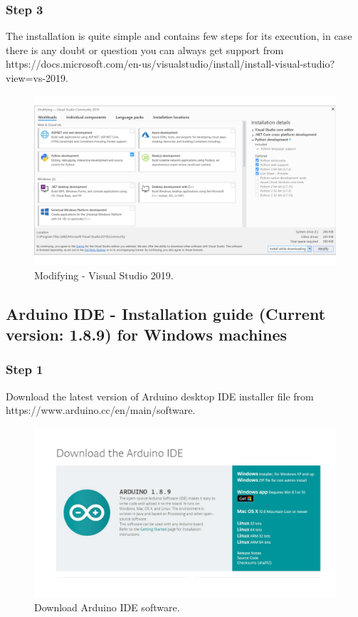 \begin{refsection}
\subsubsection{Step 3}

The installation is quite simple and contains few steps for its execution, in case there is any doubt or question you can always get support from https://docs.microsoft.com/en-us/visualstudio/install/install-visual-studio?view=vs-2019.

\begin{figure}[H]
	\centering
	\includegraphics[width=1\linewidth]{./sdf/arduino_quantum_rx/figures/VSworkloads.pdf}
	\caption{Modifying - Visual Studio 2019.}
	\label{vstudioWorkloads}
\end{figure}

\subsection{Arduino IDE - Installation guide (Current version: 1.8.9) for Windows machines}

\subsubsection{Step 1}

Download the latest version of Arduino desktop IDE installer file from https://www.arduino.cc/en/main/software.

\begin{figure}[H]
	\centering
	\includegraphics[width=0.86\linewidth]{./sdf/arduino_quantum_rx/figures/arduinoDownload.pdf}
	\caption{Download Arduino IDE software.}
	\label{arduinoDownload}
\end{figure}



\end{refsection}

